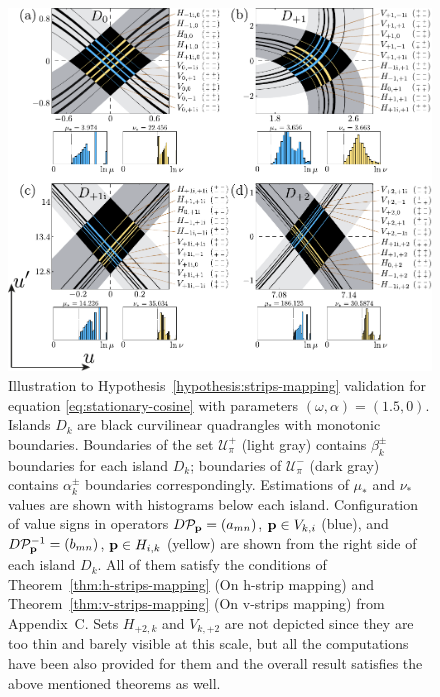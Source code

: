 \begin{figure}[h!]
\centering
	\includegraphics[scale = 1]{pic/hypotheses for cosine equation}
	\caption{
		Illustration to Hypothesis~\ref{hypothesis:strips-mapping} validation for equation \eqref{eq:stationary-cosine} with parameters $(\omega, \alpha) = (1.5, 0)$.
		Islands $D_k$ are black curvilinear quadrangles with monotonic boundaries.
		Boundaries of the set $\mathscr{U}_{\pi}^+$ (light gray) contains $\beta_k^{\pm}$ boundaries for each island $D_k$; boundaries of $\mathscr{U}_{\pi}^-$ (dark gray) contains $\alpha_k^{\pm}$ boundaries correspondingly.
		Estimations of $\mu_*$ and $\nu_*$ values are shown with histograms below each island.
		Configuration of value signs in operators $D \mathcal{P}_{\vb{p}} = (a_{mn})$, $\vb{p} \in V_{k, i}$ (blue), and $D \mathcal{P}^{-1}_{\vb{p}} = (b_{mn})$, $\vb{p} \in H_{i, k} $ (yellow) are shown from the right side of each island $D_k$.
		All of them satisfy the conditions of Theorem~\ref{thm:h-strips-mapping} (On h-strip mapping) and Theorem~\ref{thm:v-strips-mapping} (On v-strips mapping) from Appendix~C.
		Sets $H_{+2, k}$ and $V_{k, +2}$ are not depicted since they are too thin and barely visible at this scale, but all the computations have been also provided for them and the overall result satisfies the above mentioned theorems as well.
	}
\label{fig:hypotheses-validation-cosine}
\end{figure}

